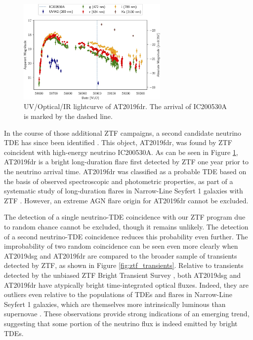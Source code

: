\documentclass[a4paper,11pt]{article}
\begin{document}
\begin{figure}[!ht]
	\centering
	\includegraphics[width=0.65\textwidth]{figures/at2019fdr_lightcurve}
	\caption{UV/Optical/IR lightcurve of AT2019fdr. The arrival of IC200530A is marked by the dashed line.}
	\label{fig:tywin_lightcurve}
\end{figure}

In the course of those additional ZTF campaigns, a second candidate neutrino TDE has since been identified \cite{ic200530a_ztf}. This object, AT2019fdr, was found by ZTF coincident with high-energy neutrino IC200530A. As can be seen in Figure \ref{fig:tywin_lightcurve}, AT2019fdr is a bright long-duration flare first detected by ZTF one year prior to the neutrino arrival time. AT2019fdr was classified as a probable TDE based on the basis of observed spectroscopic and photometric properties, as part of a systematic study of long-duration flares in Narrow-Line Seyfert 1 galaxies with ZTF \cite{frederick_20}. However, an extreme AGN flare origin for AT2019fdr cannot be excluded.

The detection of a single neutrino-TDE coincidence with our ZTF program due to random chance cannot be excluded, though it remains unlikely. The detection of a second neutrino-TDE coincidence reduces this probability even further. The improbability of two random coincidence can be seen even more clearly when AT2019dsg and AT2019fdr are compared to the broader sample of transients detected by ZTF, as shown in Figure \ref{fig:ztf_transients}. Relative to transients detected by the unbiased ZTF Bright Transient Survey \cite{ztf_bts_1, ztf_bts_2}, both AT2019dsg and AT2019fdr have atypically bright time-integrated optical fluxes. Indeed, they are outliers even relative to the populations of TDEs and flares in Narrow-Line Seyfert 1 galaxies, which are themselves more intrinsically luminous than supernovae \cite{van_velzen_20, frederick_20}. These observations provide strong indications of an emerging trend, suggesting that some portion of the neutrino flux is indeed emitted by bright TDEs.
\end{document}
